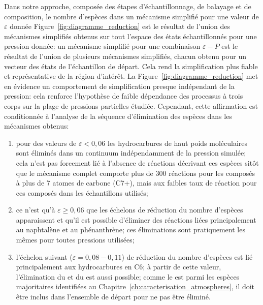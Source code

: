 Dans notre approche, composée des étapes d'échantillonnage, de balayage et de composition, le nombre d'espèces dans un mécanisme simplifié pour une valeur de $\varepsilon$ donnée Figure~\ref{fig:diagramme_reduction} est le résultat de l'union des mécanismes simplifiés obtenus sur tout l'espace des états échantillonnés pour une pression donnée: un mécanisme simplifié pour une combinaison $\varepsilon-P$ est le résultat de l'union de plusieurs mécanismes simplifiés, chacun obtenu pour un vecteur des états de l'échantillon de départ. Cela rend la simplification plus fiable et représentative de la région d'intérêt. La Figure~\ref{fig:diagramme_reduction} met en évidence un comportement de simplification presque indépendant de la pression: cela renforce l'hypothèse de faible dépendance des processus à trois corps sur la plage de pressions partielles étudiée. Cependant, cette affirmation est conditionnée à l'analyse de la séquence d'élimination des espèces dans les mécanismes obtenus:
\begin{enumerate}
  \item pour des valeurs de $\varepsilon{}<{}0,06$ les hydrocarbures de haut poids moléculaires sont éliminés dans un continuum indépendamment de la pression simulée; cela n'est pas forcement lié à l'absence de réactions décrivant ces espèces sitôt que le mécanisme complet comporte plus de 300 réactions pour les composés à plus de 7 atomes de carbone (C7+), mais aux faibles taux de réaction pour ces composés dans les échantillons utilisés;
  
  \item ce n'est qu'à $\varepsilon\ge{}0,06$ que les échelons de réduction du nombre d'espèces apparaissent et qu'il est possible d'éliminer des réactions liées principalement au naphtalène et au phénanthrène; ces éliminations sont pratiquement les mêmes pour toutes pressions utilisées;
  
  \item l'échelon suivant ($\varepsilon=0,08-0,11$) de réduction du nombre d'espèces est lié principalement aux hydrocarbures en C6; à partir de cette valeur, l'élimination du  et du  est aussi possible; comme le  est parmi les espèces majoritaires identifiées au Chapitre~\ref{ch:caracterisation_atmospheres}, il doit être inclus dans l'ensemble de départ pour ne pas être éliminé.
\end{enumerate}

